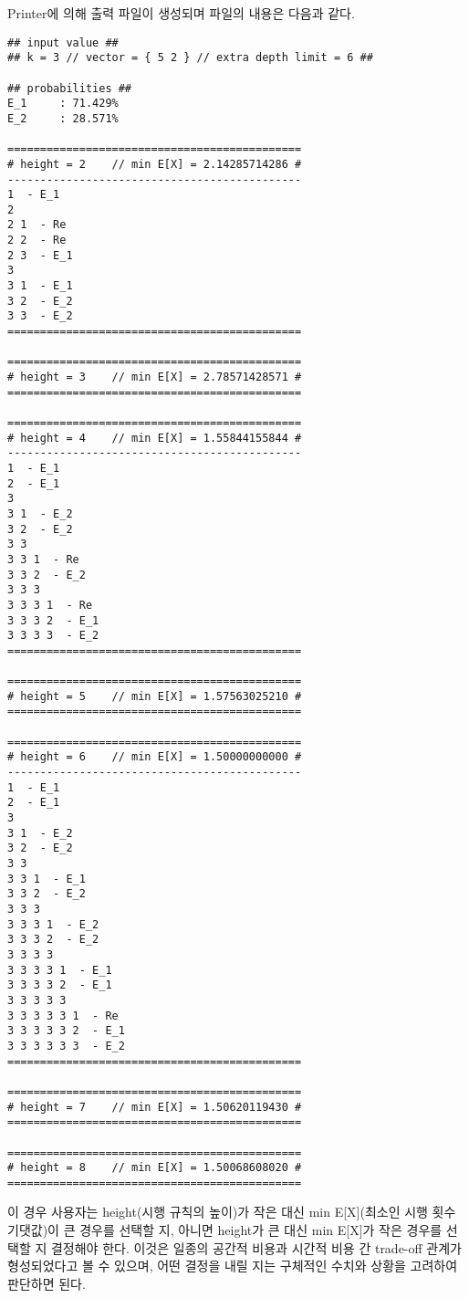 \documentclass[11pt]{article}
\begin{document}
 Printer에 의해 출력 파일이 생성되며 파일의 내용은 다음과 같다.

\singlespacing
\begin{verbatim}
## input value ##
## k = 3 // vector = { 5 2 } // extra depth limit = 6 ##

## probabilities ##
E_1  	: 71.429%
E_2  	: 28.571%

=============================================
# height = 2	// min E[X] = 2.14285714286 #
---------------------------------------------
1  - E_1
2 
2 1  - Re
2 2  - Re
2 3  - E_1
3 
3 1  - E_1
3 2  - E_2
3 3  - E_2
=============================================

=============================================
# height = 3	// min E[X] = 2.78571428571 #
=============================================

=============================================
# height = 4	// min E[X] = 1.55844155844 #
---------------------------------------------
1  - E_1
2  - E_1
3 
3 1  - E_2
3 2  - E_2
3 3 
3 3 1  - Re
3 3 2  - E_2
3 3 3 
3 3 3 1  - Re
3 3 3 2  - E_1
3 3 3 3  - E_2
=============================================

=============================================
# height = 5	// min E[X] = 1.57563025210 #
=============================================

=============================================
# height = 6	// min E[X] = 1.50000000000 #
---------------------------------------------
1  - E_1
2  - E_1
3 
3 1  - E_2
3 2  - E_2
3 3 
3 3 1  - E_1
3 3 2  - E_2
3 3 3 
3 3 3 1  - E_2
3 3 3 2  - E_2
3 3 3 3 
3 3 3 3 1  - E_1
3 3 3 3 2  - E_1
3 3 3 3 3 
3 3 3 3 3 1  - Re
3 3 3 3 3 2  - E_1
3 3 3 3 3 3  - E_2
=============================================

=============================================
# height = 7	// min E[X] = 1.50620119430 #
=============================================

=============================================
# height = 8	// min E[X] = 1.50068608020 #
=============================================
\end{verbatim}
\doublespacing

이 경우 사용자는 height(시행 규칙의 높이)가 작은 대신 min E[X](최소인 시행 횟수 기댓값)이 큰 경우를 선택할 지, 아니면 height가 큰 대신 min E[X]가 작은 경우를 선택할 지 결정해야 한다. 이것은 일종의 공간적 비용과 시간적 비용 간 trade-off 관계가 형성되었다고 볼 수 있으며, 어떤 결정을 내릴 지는 구체적인 수치와 상황을 고려하여 판단하면 된다.
\end{document}
